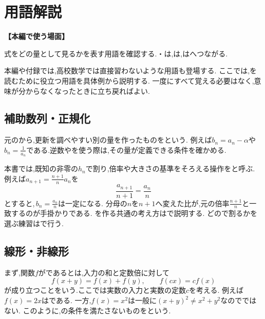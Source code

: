 
\section{用語解説}\label{節：用語解説}
  \noindent\textbf{【本編で使う場面】}\par
  式をどの量として見るかを表す用語を確認する.・は,は,はへつながる.

  本編や付録では,高校数学では直接習わないような用語も登場する.
  ここでは,を読むために役立つ用語を具体例から説明する.
  一度にすべて覚える必要はなく,意味が分からなくなったときに立ち戻ればよい.

  \subsection{補助数列・正規化}\label{節：補助数列・正規化}
    元のから,更新を調べやすい別の量を作ったものを\textbf{}という.
    例えば$b_n=a_n-\alpha$や$b_n=\frac1{a_n}$である.逆数やを使う際は,その量が定義できる条件を確かめる.

    本書では,既知の非零の$h_n$で割り,倍率や大きさの基準をそろえる操作を\textbf{}と呼ぶ.
    例えば$a_{n+1}=\frac{n+1}{n}a_n$を
    \[
      \frac{a_{n+1}}{n+1}=\frac{a_n}{n}
    \]
    とすると,\,$b_n=\frac{a_n}{n}$は一定になる.
    分母の$n$を$n+1$へ変えた比が,元の倍率$\frac{n+1}{n}$と一致するのが手掛かりである.
    を作る共通の考え方はで説明する.
    どので割るかを選ぶ練習はで行う.

  \subsection{線形・非線形}\label{節：線形・非線形}
    まず,関数$f$が\textbf{}であるとは,入力の和と定数倍に対して
    \[
      f(x+y)=f(x)+f(y),\qquad
      f(cx)=cf(x)
    \]
    が成り立つことをいう.ここでは実数の入力と実数の定数$c$を考える.
    例えば$f(x)=2x$はである.
    一方,$f(x)=x^2$は一般に$(x+y)^2\ne x^2+y^2$なのでではない.
    このように,の条件を満たさないものを\textbf{}という.

